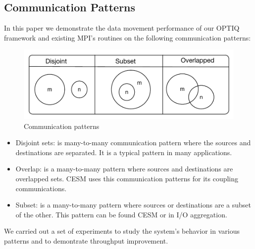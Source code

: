\subsection{Communication Patterns}
In this paper we demonstrate the data movement performance of our OPTIQ framework and existing MPI's routines on the following communication patterns:

\begin{figure}[ht]
\vspace{-0.1in}
\centering
\includegraphics[scale=0.55]{figures/patterns.pdf}
\vspace{-0.1in}
\caption{Communication patterns}
\vspace{-0.1in}
\label{fig:patterns}
\end{figure}

\begin{itemize}
\item Disjoint sets: is many-to-many communication pattern where the sources and destinations are separated. It is a typical pattern in many applications.
\item Overlap: is a many-to-many pattern where sources and destinations are overlapped sets. CESM uses this communication patterns for its coupling communications.
\item Subset: is a many-to-many pattern where sources or destinations are a subset of the other. This pattern can be found CESM or in I/O aggregation.
\end{itemize}

We carried out a set of experiments to study the system's behavior in various patterns and to demontrate throughput improvement.
